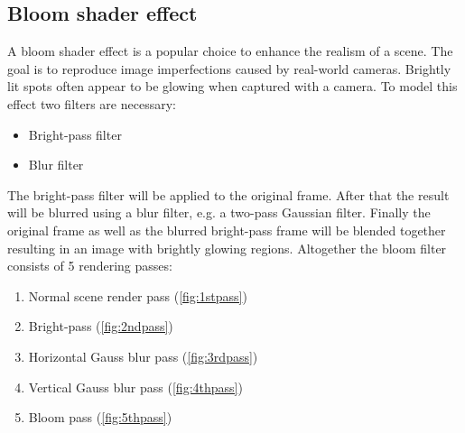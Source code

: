 \documentclass[11pt,a4paper,twoside,openright]{report}
\begin{document}
\subsection{Bloom shader effect}
A bloom shader effect is a popular choice to enhance the realism of a scene. The goal is to reproduce image imperfections caused by real-world cameras. Brightly lit spots often appear to be glowing when captured with a camera. To model this effect two filters are necessary:
\begin{itemize}
\item Bright-pass filter
\item Blur filter
\end{itemize}
The bright-pass filter will be applied to the original frame. After that the result will be blurred using a blur filter, e.g. a two-pass Gaussian filter. Finally the original frame as well as the blurred bright-pass frame will be blended together resulting in an image with brightly glowing regions. Altogether the bloom filter consists of 5 rendering passes:
\begin{enumerate}
  \item Normal scene render pass (\cref{fig:1stpass})
  \item Bright-pass (\cref{fig:2ndpass})
  \item Horizontal Gauss blur pass (\cref{fig:3rdpass})
  \item Vertical Gauss blur pass (\cref{fig:4thpass})
  \item Bloom pass (\cref{fig:5thpass})
\end{enumerate}
\end{document}
